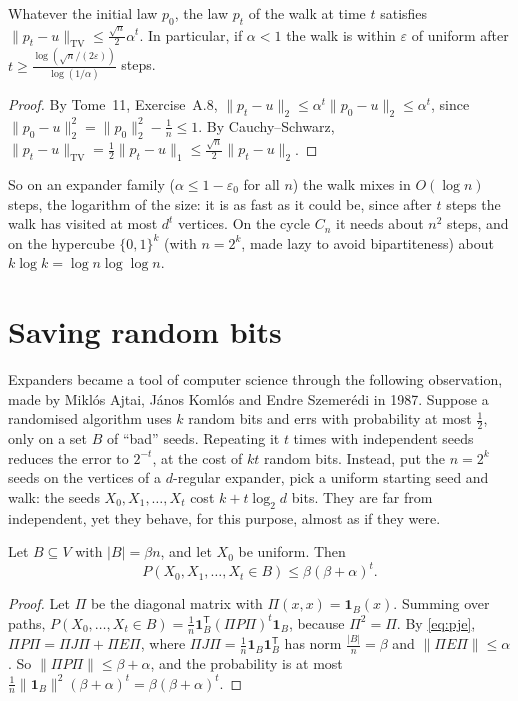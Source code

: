 \begin{proposition}[mixing]\label{prop:mixing}
Whatever the initial law $p_0$, the law $p_t$ of the walk at time $t$ satisfies $\|p_t-u\|_{\mathrm{TV}}\le\frac{\sqrt n}2\alpha^t$. In particular, if $\alpha<1$ the walk is within $\varepsilon$ of uniform after
$t\ge\frac{\log(\sqrt n/(2\varepsilon))}{\log(1/\alpha)}$ steps.
\end{proposition}

\begin{proof}
By Tome~11, Exercise~A.8, $\|p_t-u\|_2\le\alpha^t\|p_0-u\|_2\le\alpha^t$, since $\|p_0-u\|_2^2=\|p_0\|_2^2-\frac1n\le1$. By Cauchy--Schwarz, $\|p_t-u\|_{\mathrm{TV}}=\frac12\|p_t-u\|_1\le\frac{\sqrt n}2\|p_t-u\|_2$.
\end{proof}

So on an expander family ($\alpha\le1-\varepsilon_0$ for all $n$) the walk mixes in $O(\log n)$ steps, the logarithm of the size: it is as fast as it could be, since after $t$ steps the walk has visited at most
$d^t$ vertices. On the cycle $C_n$ it needs about $n^2$ steps, and on the hypercube $\{0,1\}^k$ (with $n=2^k$, made lazy to avoid bipartiteness) about $k\log k=\log n\log\log n$.

\section{Saving random bits}

Expanders became a tool of computer science through the following observation, made by Mikl\'os Ajtai, J\'anos Koml\'os and Endre Szemer\'edi in 1987. Suppose a randomised algorithm uses $k$ random bits and errs with
probability at most $\frac12$, only on a set $B$ of ``bad'' seeds. Repeating it $t$ times with independent seeds reduces the error to $2^{-t}$, at the cost of $kt$ random bits. Instead, put the $n=2^k$ seeds on the vertices of a
$d$-regular expander, pick a uniform starting seed and walk: the seeds $X_0,X_1,\dots,X_t$ cost $k+t\log_2d$ bits. They are far from independent, yet they behave, for this purpose, almost as if they were.

\begin{proposition}\label{prop:hitting}
Let $B\subseteq V$ with $|B|=\beta n$, and let $X_0$ be uniform. Then
\[
P(X_0,X_1,\dots,X_t\in B)\le\beta(\beta+\alpha)^t.
\]
\end{proposition}

\begin{proof}
Let $\Pi$ be the diagonal matrix with $\Pi(x,x)=\mathbf 1_B(x)$. Summing over paths, $P(X_0,\dots,X_t\in B)=\frac1n\mathbf 1_B^{\mathsf T}(\Pi P\Pi)^t\mathbf 1_B$, because $\Pi^2=\Pi$. By \eqref{eq:pje}, $\Pi P\Pi=\Pi J\Pi+\Pi E\Pi$, where
$\Pi J\Pi=\frac1n\mathbf 1_B\mathbf 1_B^{\mathsf T}$ has norm $\frac{|B|}n=\beta$ and $\|\Pi E\Pi\|\le\alpha$. So $\|\Pi P\Pi\|\le\beta+\alpha$, and the probability is at most $\frac1n\|\mathbf 1_B\|^2(\beta+\alpha)^t=\beta(\beta+\alpha)^t$.
\end{proof}

